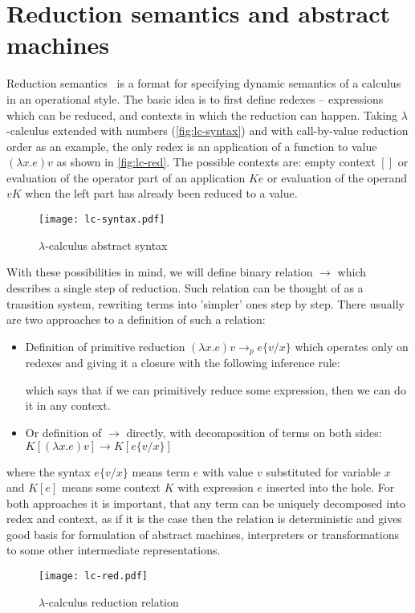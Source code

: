 \documentclass[inz, english, longabstract]{iithesis}
\newcommand{\LC}{\(\lambda\)-calculus}
\begin{document}
\section{Reduction semantics and abstract machines}
Reduction semantics~\cite{Felleisen2009} is a format for specifying dynamic semantics of a calculus in an operational style.
The basic idea is to first define redexes -- expressions which can be reduced, and contexts in which the reduction can happen.
Taking \LC{} extended with numbers (\autoref{fig:lc-syntax}) and with call-by-value reduction order as an example, the only redex is an application of a function to value $ (\lambda x . e) v $ as shown in \autoref{fig:lc-red}.
The possible contexts are: empty context $[]$ or evaluation of the operator part of an application $ K e $ or evaluation of the operand $ v K $ when the left part has already been reduced to a value.
\begin{figure}[t]
  \texttt{[image: lc-syntax.pdf]}
  \caption{\LC{} abstract syntax}
  \label{fig:lc-syntax}
\end{figure}
With these possibilities in mind, we will define binary relation $ \longrightarrow $ which describes a single step of reduction.
Such relation can be thought of as a transition system, rewriting terms into 'simpler' ones step by step.
There usually are two approaches to a definition of such a relation:
\begin{itemize}
  \item Definition of primitive reduction $ (\lambda x . e) v \longrightarrow_p e\{v/x\} $ which operates only on redexes and giving it a closure with the following inference rule:
  
  \begin{prooftree}
  \end{prooftree}

  which says that if we can primitively reduce some expression, then we can do it in any context.
  \item Or definition of $ \longrightarrow $ directly, with decomposition of terms on both sides: $ K[(\lambda x . e) v] \longrightarrow K[e\{v/x\}] $
\end{itemize}
where the syntax $ e\{v/x\} $ means term $ e $ with value $ v $ substituted for variable $ x $ and $ K[e] $ means some context $ K $ with expression $ e $ inserted into the hole.
For both approaches it is important, that any term can be uniquely decomposed into redex and context, as if it is the case then the relation is deterministic and gives good basis for formulation of abstract machines, interpreters or transformations to some other intermediate representations.
\begin{figure}
  \texttt{[image: lc-red.pdf]} 
  \caption{\LC{} reduction relation}
  \label{fig:lc-red}
\end{figure}
\end{document}
